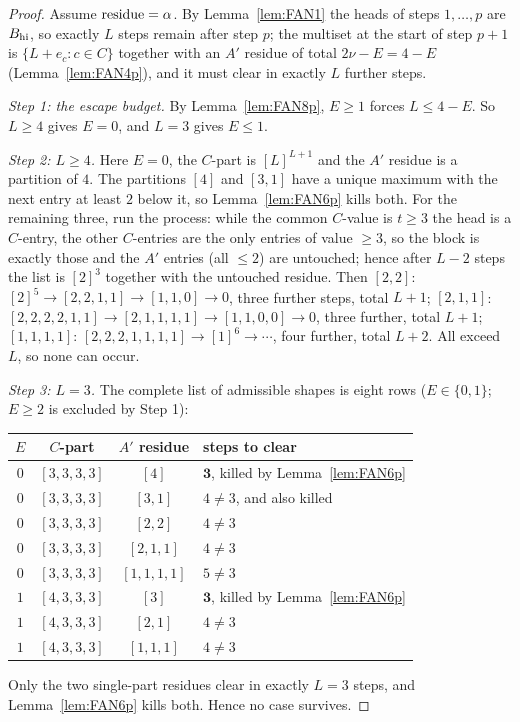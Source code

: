 \begin{proof}
Assume $\operatorname{residue} = \alpha$. By Lemma~\ref{lem:FAN1} the heads of steps $1,\dots,p$ are $B_{\mathrm{hi}}$,
so exactly $L$ steps remain after step $p$; the multiset at the start of step $p+1$ is
$\{L+e_c : c \in C\}$ together with an $A'$ residue of total $2\nu - E = 4 - E$
(Lemma~\ref{lem:FAN4p}), and it must clear in exactly $L$ further steps.

\emph{Step 1: the escape budget.} By Lemma~\ref{lem:FAN8p}, $E \ge 1$ forces $L \le 4-E$.
So $L \ge 4$ gives $E = 0$, and $L = 3$ gives $E \le 1$.

\emph{Step 2: $L \ge 4$.} Here $E = 0$, the $C$-part is $[L]^{L+1}$ and the $A'$ residue is
a partition of $4$. The partitions $[4]$ and $[3,1]$ have a unique maximum with the next
entry at least $2$ below it, so Lemma~\ref{lem:FAN6p} kills both. For the remaining three,
run the process: while the common $C$-value is $t \ge 3$ the head is a $C$-entry, the other
$C$-entries are the only entries of value $\ge 3$, so the block is exactly those and the
$A'$ entries (all $\le 2$) are untouched; hence after $L-2$ steps the list is $[2]^3$
together with the untouched residue. Then
$[2,2]$: $[2]^5 \to [2,2,1,1] \to [1,1,0] \to 0$, three further steps, total $L+1$;
$[2,1,1]$: $[2,2,2,2,1,1] \to [2,1,1,1,1] \to [1,1,0,0] \to 0$, three further, total $L+1$;
$[1,1,1,1]$: $[2,2,2,1,1,1,1] \to [1]^6 \to \cdots$, four further, total $L+2$.
All exceed $L$, so none can occur.

\emph{Step 3: $L = 3$.} The complete list of admissible shapes is eight rows
($E \in \{0,1\}$; $E \ge 2$ is excluded by Step 1):
\begin{center}
\begin{tabular}{@{}cccl@{}}
\toprule
$E$ & $C$-part & $A'$ residue & steps to clear \\
\midrule
$0$ & $[3,3,3,3]$ & $[4]$ & $\mathbf{3}$, killed by Lemma~\ref{lem:FAN6p} \\
$0$ & $[3,3,3,3]$ & $[3,1]$ & $4 \ne 3$, and also killed \\
$0$ & $[3,3,3,3]$ & $[2,2]$ & $4 \ne 3$ \\
$0$ & $[3,3,3,3]$ & $[2,1,1]$ & $4 \ne 3$ \\
$0$ & $[3,3,3,3]$ & $[1,1,1,1]$ & $5 \ne 3$ \\
$1$ & $[4,3,3,3]$ & $[3]$ & $\mathbf{3}$, killed by Lemma~\ref{lem:FAN6p} \\
$1$ & $[4,3,3,3]$ & $[2,1]$ & $4 \ne 3$ \\
$1$ & $[4,3,3,3]$ & $[1,1,1]$ & $4 \ne 3$ \\
\bottomrule
\end{tabular}
\end{center}
Only the two single-part residues clear in exactly $L = 3$ steps, and
Lemma~\ref{lem:FAN6p} kills both. Hence no case survives.
\end{proof}

